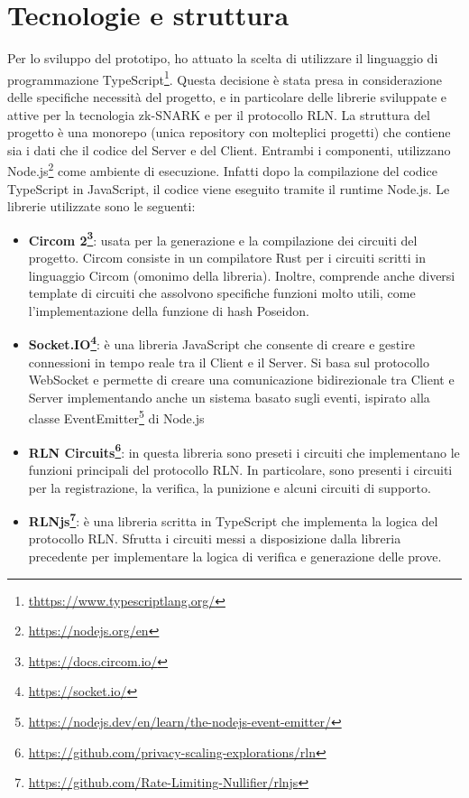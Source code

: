 \section{Tecnologie e struttura}
Per lo sviluppo del prototipo, ho attuato la scelta di utilizzare il linguaggio di programmazione
TypeScript\footnote{\url{thttps://www.typescriptlang.org/}}. Questa decisione è stata presa in considerazione delle
specifiche necessità del progetto, e in particolare delle librerie sviluppate e attive per la tecnologia zk-SNARK e per
il protocollo RLN. La struttura del progetto è una monorepo (unica repository con molteplici progetti) che contiene sia
i dati che il codice del Server e del Client. Entrambi i componenti, utilizzano
Node.js\footnote{\url{https://nodejs.org/en}} come ambiente di esecuzione. Infatti dopo la compilazione del codice
TypeScript in JavaScript, il codice viene eseguito tramite il runtime Node.js. Le librerie utilizzate sono le seguenti:
\begin{itemize}
    \item \textbf{Circom 2\footnote{\url{https://docs.circom.io/}}}: usata per la generazione e la compilazione dei
    circuiti del progetto. Circom consiste in un compilatore Rust per i circuiti scritti in linguaggio Circom (omonimo
    della libreria). Inoltre, comprende anche diversi template di circuiti che assolvono specifiche funzioni molto utili,
    come l'implementazione della funzione di hash Poseidon.
    \item \textbf{Socket.IO\footnote{\url{https://socket.io/}}}: è una libreria JavaScript che consente di creare e
    gestire connessioni in tempo reale tra il Client e il Server. Si basa sul protocollo WebSocket e permette di creare una
    comunicazione bidirezionale tra Client e Server implementando anche un sistema basato sugli eventi, ispirato alla
    classe EventEmitter\footnote{\url{https://nodejs.dev/en/learn/the-nodejs-event-emitter/}} di Node.js
    \item \textbf{RLN Circuits\footnote{\url{https://github.com/privacy-scaling-explorations/rln}}}: in questa libreria
    sono preseti i circuiti che implementano le funzioni principali del protocollo RLN. In particolare, sono presenti i
    circuiti per la registrazione, la verifica, la punizione e alcuni circuiti di supporto.
    \item \textbf{RLNjs\footnote{\url{https://github.com/Rate-Limiting-Nullifier/rlnjs}}}: è una libreria scritta in
    TypeScript che implementa la logica del protocollo RLN. Sfrutta i circuiti messi a disposizione dalla libreria
    precedente per implementare la logica di verifica e generazione delle prove.
\end{itemize}

